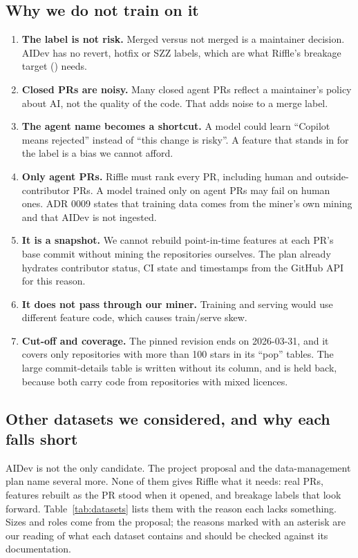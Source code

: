 \documentclass[11pt,a4paper]{article}
\newcommand{\code}[1]{\texttt{\detokenize{#1}}}
\begin{document}
\subsection{Why we do not train on it}
\begin{enumerate}
  \item \textbf{The label is not risk.} Merged versus not merged is a maintainer decision. AIDev has no revert, hotfix or SZZ labels, which are what Riffle's breakage target (\code{label_bad}) needs.
  \item \textbf{Closed PRs are noisy.} Many closed agent PRs reflect a maintainer's policy about AI, not the quality of the code. That adds noise to a merge label.
  \item \textbf{The agent name becomes a shortcut.} A model could learn ``Copilot means rejected'' instead of ``this change is risky''. A feature that stands in for the label is a bias we cannot afford.
  \item \textbf{Only agent PRs.} Riffle must rank every PR, including human and outside-contributor PRs. A model trained only on agent PRs may fail on human ones. ADR 0009 states that training data comes from the miner's own mining and that AIDev is not ingested.
  \item \textbf{It is a snapshot.} We cannot rebuild point-in-time features at each PR's base commit without mining the repositories ourselves. The plan already hydrates contributor status, CI state and timestamps from the GitHub API for this reason.
  \item \textbf{It does not pass through our miner.} Training and serving would use different feature code, which causes train/serve skew.
  \item \textbf{Cut-off and coverage.} The pinned revision ends on 2026-03-31, and it covers only repositories with more than 100 stars in its ``pop'' tables. The large commit-details table is written without its \code{patch} column, and \code{pr_review_comments} is held back, because both carry code from repositories with mixed licences.
\end{enumerate}

\subsection{Other datasets we considered, and why each falls short}
AIDev is not the only candidate. The project proposal and the data-management plan name several more. None of them gives Riffle what it needs: real PRs, features rebuilt as the PR stood when it opened, and breakage labels that look forward. Table~\ref{tab:datasets} lists them with the reason each lacks something. Sizes and roles come from the proposal; the reasons marked with an asterisk are our reading of what each dataset contains and should be checked against its documentation.
\end{document}
